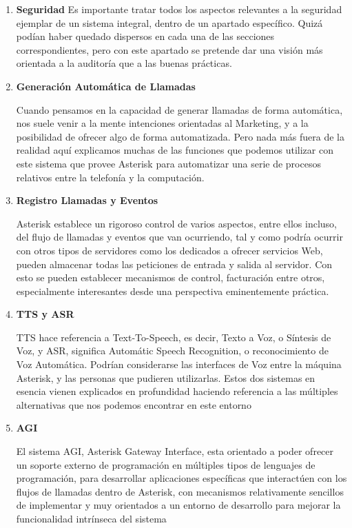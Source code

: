 \begin{enumerate}
	  \setlength{\itemsep}{10pt}

	\item \textbf{Seguridad}
	Es importante tratar todos los aspectos relevantes a la seguridad ejemplar de un sistema integral, dentro de un apartado específico. Quizá podían haber quedado dispersos en cada una de las secciones correspondientes, pero con este apartado se pretende dar una visión más orientada a la auditoría que a las buenas prácticas.
	
	\item \textbf{Generación Automática de Llamadas}
	
	Cuando pensamos en la capacidad de generar llamadas de forma automática, nos suele venir a la mente intenciones orientadas al Marketing, y a la posibilidad de ofrecer algo de forma automatizada. Pero nada más fuera de la realidad aquí explicamos muchas de las funciones que podemos utilizar con este sistema que provee Asterisk para automatizar una serie de procesos relativos entre la telefonía y la computación.
	
	\item \textbf{Registro Llamadas y Eventos}
	
	Asterisk establece un rigoroso control de varios aspectos, entre ellos incluso, del flujo de llamadas y eventos que van ocurriendo, tal y como podría ocurrir con otros tipos de servidores como los dedicados a ofrecer servicios Web, pueden almacenar todas las peticiones de entrada y salida al servidor. Con esto se pueden establecer mecanismos de control, facturación entre otros, especialmente interesantes desde una perspectiva eminentemente práctica.
	
	\item \textbf{TTS y ASR}
	
	TTS hace referencia a Text-To-Speech, es decir, Texto a Voz, o Síntesis de Voz, y ASR, significa Automátic Speech Recognition, o reconocimiento de Voz Automática. Podrían considerarse las interfaces de Voz entre la máquina Asterisk, y las personas que pudieren utilizarlas. Estos dos sistemas en esencia vienen explicados en profundidad haciendo referencia a las múltiples alternativas que nos podemos encontrar en este entorno
	
  \item \textbf{AGI}
	
	El sistema AGI, Asterisk Gateway Interface, esta orientado a poder ofrecer un soporte externo de programación en múltiples tipos de lenguajes de programación, para desarrollar aplicaciones específicas que interactúen con los flujos de llamadas dentro de Asterisk, con mecanismos relativamente sencillos de implementar y muy orientados a un entorno de desarrollo para mejorar la funcionalidad intrínseca del sistema
	

\end{enumerate}
